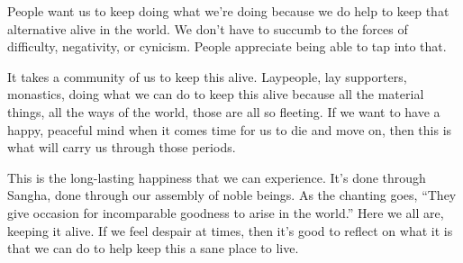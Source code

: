 People want us to keep doing what we're doing \linebreak because we do help to keep that alternative alive in the world. We don't have to succumb to the forces of difficulty, negativity, or cynicism. People appreciate being able to tap into that.

It takes a community of us to keep this alive. Laypeople, lay supporters, monastics, doing what we can do to keep this alive because all the material things, all the ways of the world, those are all so fleeting. If we want to have a happy, peaceful mind when it comes time for us to die and move on, then this is what will carry us through those periods.

{\parfillskip=0pt
This is the long-lasting happiness that we can experience. It's done through Sangha, done through our assembly of noble beings. As the chanting goes, ``They give occasion for incomparable goodness to arise in the world.'' Here we all are, keeping it alive. If we feel despair at times, then it's good to reflect on what it \linebreak is that we can do to help keep this a sane place to live.
\par}
